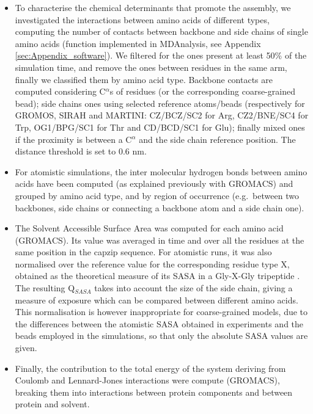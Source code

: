 \begin{itemize}
\item To characterise the chemical determinants that promote the assembly, we investigated the interactions between amino acids of different types, computing the number of contacts between backbone and side chains of single amino acids (function implemented in MDAnalysis, see Appendix \ref{sec:Appendix_software}). We filtered for the ones present at least 50\% of the simulation time, and remove the ones between residues in the same arm, finally we classified them by amino acid type.
%
Backbone contacts are computed considering C$^\alpha$s of residues (or the corresponding coarse-grained bead); side chains ones using selected reference atoms/beads (respectively for GROMOS, SIRAH and MARTINI: CZ/BCZ/SC2 for Arg, CZ2/BNE/SC4 for Trp, OG1/BPG/SC1 for Thr and CD/BCD/SC1 for Glu); finally mixed ones if the proximity is between a C$^\alpha$ and the side chain reference position. The distance threshold is set to 0.6 nm.

\item For atomistic simulations, the inter molecular hydrogen bonds between amino acids have been computed (as explained previously with GROMACS) and grouped by amino acid type, and by region of occurrence (e.g.\ between two backbones, side chains or connecting a backbone atom and a side chain one).

\item The Solvent Accessible Surface Area was computed for each amino acid (GROMACS). Its value was averaged in time and over all the residues at the same position in the capzip sequence. For atomistic runs, it was also normalised over the reference value for the corresponding residue type X, obtained as the theoretical measure of its SASA in a Gly-X-Gly tripeptide \citep{Tien2013}. The resulting Q$_{SASA}$ takes into account the size of the side chain, giving a measure of exposure which can be compared between different amino acids. 
%
This normalisation is however inappropriate for coarse-grained models, due to the differences between the atomistic SASA obtained in experiments and the beads employed in the simulations, so that only the absolute SASA values are given.

\item Finally, the contribution to the total energy of the system deriving from Coulomb and Lennard-Jones interactions were compute (GROMACS), breaking them into interactions between protein components and between protein and solvent.
\end{itemize}

